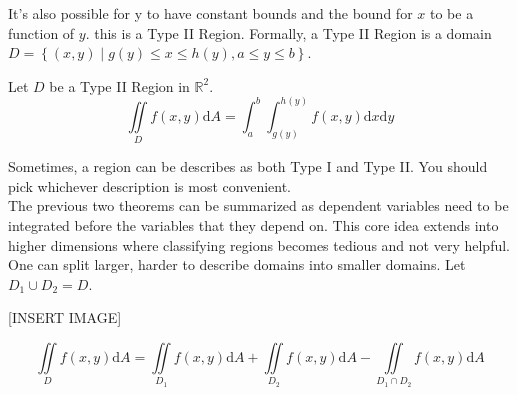 \noindent
It's also possible for y to have constant bounds and the bound for $x$ to be a function of $y$. this is a Type II Region. Formally, a Type II Region is a domain $D = \left\{(x,y) \mid g(y) \leq x \leq h(y), a \leq y \leq b\right\}$.

\begin{theorem}
	Let $D$ be a Type II Region in $\mathbb{R}^2$.
	\begin{equation*}
		\iint\limits_{D}{f(x,y)\mathrm{d}A} = \int_{a}^{b}{\int_{g(y)}^{h(y)}{f(x,y)\mathrm{d}x}\mathrm{d}y}
	\end{equation*}
\end{theorem}

\noindent
Sometimes, a region can be describes as both Type I and Type II. You should pick whichever description is most convenient.\\

\noindent
The previous two theorems can be summarized as dependent variables need to be integrated before the variables that they depend on. This core idea extends into higher dimensions where classifying regions becomes tedious and not very helpful.\\

\noindent
One can split larger, harder to describe domains into smaller domains. Let $D_1 \cup D_2 = D$.

[INSERT IMAGE]

\begin{equation*}
	\iint\limits_{D}{f(x,y)\mathrm{d}A} = \iint\limits_{D_1}{f(x,y)\mathrm{d}A} + \iint\limits_{D_2}{f(x,y)\mathrm{d}A} - \iint\limits_{D_1 \cap D_2}{f(x,y)\mathrm{d}A}
\end{equation*}